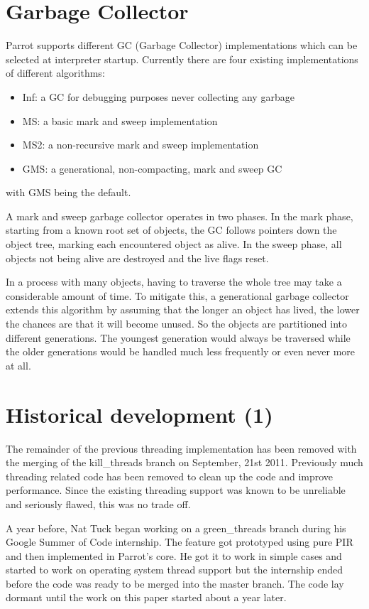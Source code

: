 \documentclass[bachelor,english]{hgbthesis}
\begin{document}
\section{Garbage Collector}

Parrot supports different GC (Garbage Collector) implementations which can be selected at interpreter startup. Currently there are four existing implementations of different algorithms:
\begin{itemize}
\item Inf: a GC for debugging purposes never collecting any garbage
\item MS: a basic mark and sweep implementation
\item MS2: a non-recursive mark and sweep implementation
\item GMS: a generational, non-compacting, mark and sweep GC
\end{itemize}
with GMS being the default.

A mark and sweep garbage collector operates in two phases. In the mark phase, starting from a known root set of objects, the GC follows pointers down the object tree, marking each encountered object as alive. In the sweep phase, all objects not being alive are destroyed and the live flags reset.

In a process with many objects, having to traverse the whole tree may take a considerable amount of time. To mitigate this, a generational garbage collector extends this algorithm by assuming that the longer an object has lived, the lower the chances are that it will become unused. So the objects are partitioned into different generations. The youngest generation would always be traversed while the older generations would be handled much less frequently or even never more at all.

\section{Historical development (1)}

The remainder of the previous threading implementation has been removed with the merging of the kill\_threads branch on September, 21st 2011. Previously much threading related code has been removed to clean up the code and improve performance. Since the existing threading support was known to be unreliable and seriously flawed, this was no trade off.

A year before, Nat Tuck began working on a green\_threads branch during his Google Summer of Code internship. The feature got prototyped using pure PIR and then implemented in Parrot's core. He got it to work in simple cases and started to work on operating system thread support but the internship ended before the code was ready to be merged into the master branch. The code lay dormant until the work on this paper started about a year later.
\end{document}
